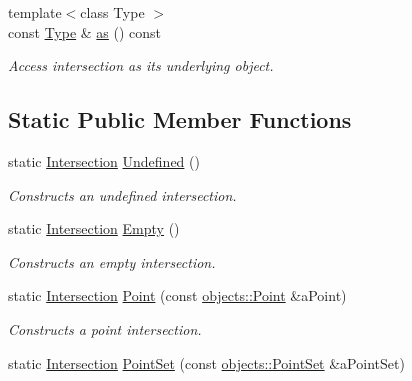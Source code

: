 \begin{DoxyCompactItemize}
$${\footnotesize template$<$class Type $>$ }\\const \hyperlink{classlibrary_1_1math_1_1geom_1_1d3_1_1_intersection_a3465d607fd42380f350598e055271b05}{Type} \& \hyperlink{classlibrary_1_1math_1_1geom_1_1d3_1_1_intersection_a018842f95665de8a388f0b7cd48410a6}{as} () const
\begin{DoxyCompactList}\small\item\em Access intersection as its underlying object. \end{DoxyCompactList}\end{DoxyCompactItemize}
\subsection*{Static Public Member Functions}
\begin{DoxyCompactItemize}
\item 
static \hyperlink{classlibrary_1_1math_1_1geom_1_1d3_1_1_intersection}{Intersection} \hyperlink{classlibrary_1_1math_1_1geom_1_1d3_1_1_intersection_a6ce0af0ff5c24a4b56c264d2d3d6e59b}{Undefined} ()
\begin{DoxyCompactList}\small\item\em Constructs an undefined intersection. \end{DoxyCompactList}\item 
static \hyperlink{classlibrary_1_1math_1_1geom_1_1d3_1_1_intersection}{Intersection} \hyperlink{classlibrary_1_1math_1_1geom_1_1d3_1_1_intersection_af0f1aed5c97a5142a4b20cb8edcb78e0}{Empty} ()
\begin{DoxyCompactList}\small\item\em Constructs an empty intersection. \end{DoxyCompactList}\item 
static \hyperlink{classlibrary_1_1math_1_1geom_1_1d3_1_1_intersection}{Intersection} \hyperlink{classlibrary_1_1math_1_1geom_1_1d3_1_1_intersection_a5155cc245bd2bf96a4296b0a8319c709}{Point} (const \hyperlink{classlibrary_1_1math_1_1geom_1_1d3_1_1objects_1_1_point}{objects\+::\+Point} \&a\+Point)
\begin{DoxyCompactList}\small\item\em Constructs a point intersection. \end{DoxyCompactList}\item 
static \hyperlink{classlibrary_1_1math_1_1geom_1_1d3_1_1_intersection}{Intersection} \hyperlink{classlibrary_1_1math_1_1geom_1_1d3_1_1_intersection_a562d64d802f6fcd181f1122393642605}{Point\+Set} (const \hyperlink{classlibrary_1_1math_1_1geom_1_1d3_1_1objects_1_1_point_set}{objects\+::\+Point\+Set} \&a\+Point\+Set)

\end{DoxyCompactItemize}
